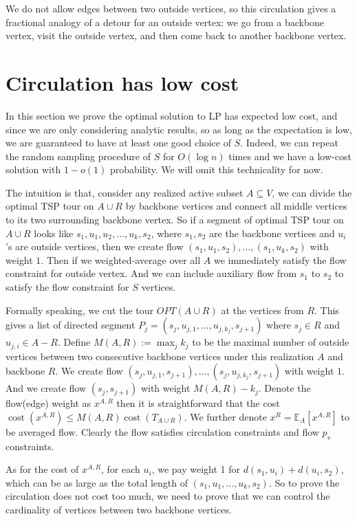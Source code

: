 \documentclass[11pt]{article}
\newcommand{\E}{\mathbb{E}}
\newcommand{\1}{\mathbf{1}}
\newcommand{\cost}{\operatorname{cost}}
\begin{document}
We do not allow edges between two outside vertices, so this circulation gives 
a fractional analogy of a detour for an outside vertex: we go from a backbone 
vertex, visit the outside vertex, and then come back to another backbone vertex.

\section{Circulation has low cost}

In this section we prove the optimal solution to LP has expected low cost, 
and since we are only considering analytic results, so as long as the expectation 
is low, we are guaranteed to have at least one good choice of $S$. Indeed, we 
can repeat the random sampling procedure of $S$ for $O(\log n)$ times and we 
have a low-cost solution with $1-o(1)$ probability. We will omit this technicality 
for now.


The intuition is that, consider any realized active subset $A \subseteq V$, we 
can divide the optimal TSP tour on $A \cup R$ by backbone vertices and connect 
all middle vertices to its two surrounding backbone vertex. So if a segment of 
optimal TSP tour on $A \cup R$ looks like $s_1, u_1, u_2, \dots, u_k, s_2$, where
$s_1, s_2$ are the backbone vertices and $u_i$'s are outside vertices, then 
we create flow $(s_1, u_1, s_2), \dots, (s_1, u_k, s_2)$ with weight $1$. Then 
if we weighted-average over all $A$ we immediately satisfy the flow constraint 
for outside vertex. And we can include auxiliary flow from $s_1$ to $s_2$ to 
satisfy the flow constraint for $S$ vertices. 

Formally speaking, we cut the tour $OPT(A \cup R)$ at the vertices from $R$. 
This gives a list of directed segment $P_j = (s_j, u_{j,1}, \dots, u_{j, k_j}, s_{j+1})$ 
where $s_j \in R$ and $u_{j, i} \in A - R$. 
Define $M(A, R) := \max_j k_j$ to be the maximal number of outside vertices 
between two consecutive backbone vertices under this realization $A$ and backbone $R$. 
We create flow $(s_j, u_{j, 1}, s_{j+1}), \dots, (s_{j}, u_{j,k_j}, s_{j+1})$ with weight $1$.
And we create flow $(s_{j}, s_{j+1})$ with weight $M(A,R) - k_j$.
Denote the flow(edge) weight as $x^{A,R}$ then it is straightforward that 
the cost $\cost(x^{A,R}) \le M(A,R) \cost(T_{A \cup R})$.
We further denote $x^{R} = \E_A [x^{A,R}]$ to be averaged flow. Clearly the flow 
satisfies circulation constraints and flow $p_v$ constraints.

As for the cost of $x^{A,R}$, for each $u_i$, we pay weight 1 for $d(s_1, u_i) + d(u_i, s_2)$,
which can be as large as the total length of $(s_1, u_1, \dots, u_k, s_2)$. 
So to prove the circulation does not cost too much, we need to prove that we can
control the cardinality of vertices between two backbone vertices. 
\end{document}

